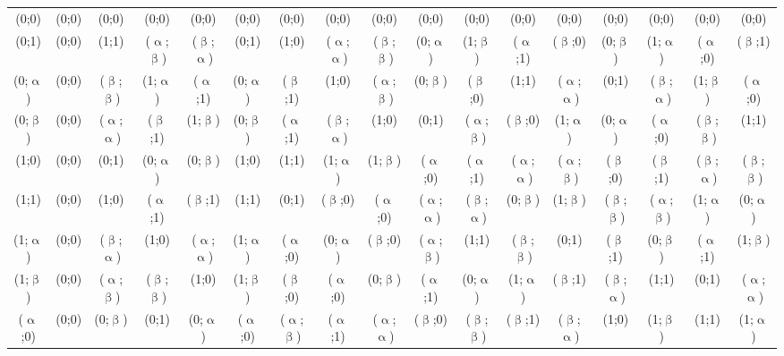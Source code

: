 {\begin{minipage}[c]{0.9\textheight}
\begin{center}
\begin{tabularx}{1.06\linewidth}{c|cccccccccccccccc}
 (0;0) & (0;0) & (0;0) & (0;0) & (0;0) & (0;0) & (0;0) & (0;0) & (0;0) & (0;0) & (0;0) & (0;0) & (0;0) & (0;0) & (0;0) & (0;0) & (0;0) \\
 (0;1) & (0;0) & (1;1) & ($\upalpha$;$\upbeta$) & ($\upbeta$;$\upalpha$) & (0;1) & (1;0) & ($\upalpha$;$\upalpha$) & ($\upbeta$;$\upbeta$) & (0;$\upalpha$) & (1;$\upbeta$) & ($\upalpha$;1) & ($\upbeta$;0) & (0;$\upbeta$) & (1;$\upalpha$) & ($\upalpha$;0) & ($\upbeta$;1) \\
 (0;$\upalpha$) & (0;0) & ($\upbeta$;$\upbeta$) & (1;$\upalpha$) & ($\upalpha$;1) & (0;$\upalpha$) & ($\upbeta$;1) & (1;0) & ($\upalpha$;$\upbeta$) & (0;$\upbeta$) & ($\upbeta$;0) & (1;1) & ($\upalpha$;$\upalpha$) & (0;1) & ($\upbeta$;$\upalpha$) & (1;$\upbeta$) & ($\upalpha$;0) \\
 (0;$\upbeta$) & (0;0) & ($\upalpha$;$\upalpha$) & ($\upbeta$;1) & (1;$\upbeta$) & (0;$\upbeta$) & ($\upalpha$;1) & ($\upbeta$;$\upalpha$) & (1;0) & (0;1) & ($\upalpha$;$\upbeta$) & ($\upbeta$;0) & (1;$\upalpha$) & (0;$\upalpha$) & ($\upalpha$;0) & ($\upbeta$;$\upbeta$) & (1;1) \\
 (1;0) & (0;0) & (0;1) & (0;$\upalpha$) & (0;$\upbeta$) & (1;0) & (1;1) & (1;$\upalpha$) & (1;$\upbeta$) & ($\upalpha$;0) & ($\upalpha$;1) & ($\upalpha$;$\upalpha$) & ($\upalpha$;$\upbeta$) & ($\upbeta$;0) & ($\upbeta$;1) & ($\upbeta$;$\upalpha$) & ($\upbeta$;$\upbeta$) \\
 (1;1) & (0;0) & (1;0) & ($\upalpha$;1) & ($\upbeta$;1) & (1;1) & (0;1) & ($\upbeta$;0) & ($\upalpha$;0) & ($\upalpha$;$\upalpha$) & ($\upbeta$;$\upalpha$) & (0;$\upbeta$) & (1;$\upbeta$) & ($\upbeta$;$\upbeta$) & ($\upalpha$;$\upbeta$) & (1;$\upalpha$) & (0;$\upalpha$) \\
 (1;$\upalpha$) & (0;0) & ($\upbeta$;$\upalpha$) & (1;0) & ($\upalpha$;$\upalpha$) & (1;$\upalpha$) & ($\upalpha$;0) & (0;$\upalpha$) & ($\upbeta$;0) & ($\upalpha$;$\upbeta$) & (1;1) & ($\upbeta$;$\upbeta$) & (0;1) & ($\upbeta$;1) & (0;$\upbeta$) & ($\upalpha$;1) & (1;$\upbeta$) \\
 (1;$\upbeta$) & (0;0) & ($\upalpha$;$\upbeta$) & ($\upbeta$;$\upbeta$) & (1;0) & (1;$\upbeta$) & ($\upbeta$;0) & ($\upalpha$;0) & (0;$\upbeta$) & ($\upalpha$;1) & (0;$\upalpha$) & (1;$\upalpha$) & ($\upbeta$;1) & ($\upbeta$;$\upalpha$) & (1;1) & (0;1) & ($\upalpha$;$\upalpha$) \\
 ($\upalpha$;0) & (0;0) & (0;$\upbeta$) & (0;1) & (0;$\upalpha$) & ($\upalpha$;0) & ($\upalpha$;$\upbeta$) & ($\upalpha$;1) & ($\upalpha$;$\upalpha$) & ($\upbeta$;0) & ($\upbeta$;$\upbeta$) & ($\upbeta$;1) & ($\upbeta$;$\upalpha$) & (1;0) & (1;$\upbeta$) & (1;1) & (1;$\upalpha$) \\

\end{tabularx}
\end{center}
\end{minipage}}

